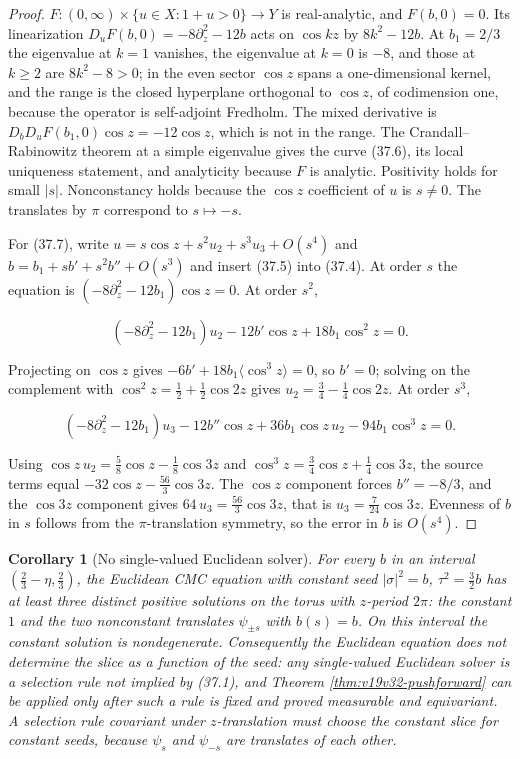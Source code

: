 \documentclass[11pt]{article}
\newtheorem{corollary}[theorem]{Corollary}
\theoremstyle{remark}
\begin{document}
\begin{proof}
\(F:(0,\infty)\times\{u\in X:1+u>0\}\to Y\) is real-analytic, and
\(F(b,0)=0\).  Its linearization
\(D_uF(b,0)=-8\partial_z^2-12b\) acts on \(\cos kz\) by
\(8k^2-12b\).  At \(b_1=2/3\) the eigenvalue at \(k=1\) vanishes, the
eigenvalue at \(k=0\) is \(-8\), and those at \(k\geq2\) are
\(8k^2-8>0\); in the even sector \(\cos z\) spans a one-dimensional
kernel, and the range is the closed hyperplane orthogonal to
\(\cos z\), of codimension one, because the operator is self-adjoint
Fredholm.  The mixed derivative is
\(D_bD_uF(b_1,0)\cos z=-12\cos z\), which is not in the range.  The
Crandall--Rabinowitz theorem at a simple eigenvalue gives the curve
(37.6), its local uniqueness statement, and analyticity because \(F\)
is analytic.  Positivity holds for small \(|s|\).  Nonconstancy holds
because the \(\cos z\) coefficient of \(u\) is \(s\neq0\).  The
translates by \(\pi\) correspond to \(s\mapsto-s\).

For (37.7), write \(u=s\cos z+s^2u_2+s^3u_3+O(s^4)\) and
\(b=b_1+sb'+s^2b''+O(s^3)\) and insert (37.5) into (37.4).  At order
\(s\) the equation is \((-8\partial_z^2-12b_1)\cos z=0\).  At order
\(s^2\),

\[
 (-8\partial_z^2-12b_1)u_2-12b'\cos z+18b_1\cos^2z=0.              \tag{37.8}
\]

Projecting on \(\cos z\) gives \(-6b'+18b_1\langle\cos^3z\rangle=0\),
so \(b'=0\); solving on the complement with
\(\cos^2z=\tfrac12+\tfrac12\cos2z\) gives
\(u_2=\tfrac34-\tfrac14\cos2z\).  At order \(s^3\),

\[
 (-8\partial_z^2-12b_1)u_3-12b''\cos z+36b_1\cos z\,u_2
 -94b_1\cos^3z=0.                                                  \tag{37.9}
\]

Using \(\cos z\,u_2=\tfrac58\cos z-\tfrac18\cos3z\) and
\(\cos^3z=\tfrac34\cos z+\tfrac14\cos3z\), the source terms equal
\(-32\cos z-\tfrac{56}3\cos3z\).  The \(\cos z\) component forces
\(b''=-8/3\), and the \(\cos3z\) component gives
\(64\,u_3=\tfrac{56}3\cos3z\), that is \(u_3=\tfrac7{24}\cos3z\).
Evenness of \(b\) in \(s\) follows from the \(\pi\)-translation
symmetry, so the error in \(b\) is \(O(s^4)\).
\end{proof}

\begin{corollary}[No single-valued Euclidean solver]
\label{cor:v19v34-multivalued}
For every \(b\) in an interval \((\tfrac23-\eta,\tfrac23)\), the
Euclidean CMC equation with constant seed \(|\sigma|^2=b\),
\(\tau^2=\tfrac32b\) has at least three distinct positive solutions on the
torus with \(z\)-period \(2\pi\): the constant \(1\) and the two
nonconstant translates \(\psi_{\pm s}\) with \(b(s)=b\).  On this
interval the constant solution is nondegenerate.  Consequently the
Euclidean equation does not determine the slice as a function of the
seed: any single-valued Euclidean solver is a selection rule not
implied by (37.1), and Theorem \ref{thm:v19v32-pushforward} can be
applied only after such a rule is fixed and proved measurable and
equivariant.  A selection rule covariant under \(z\)-translation must
choose the constant slice for constant seeds, because \(\psi_s\) and
\(\psi_{-s}\) are translates of each other.
\end{corollary}
\end{document}
